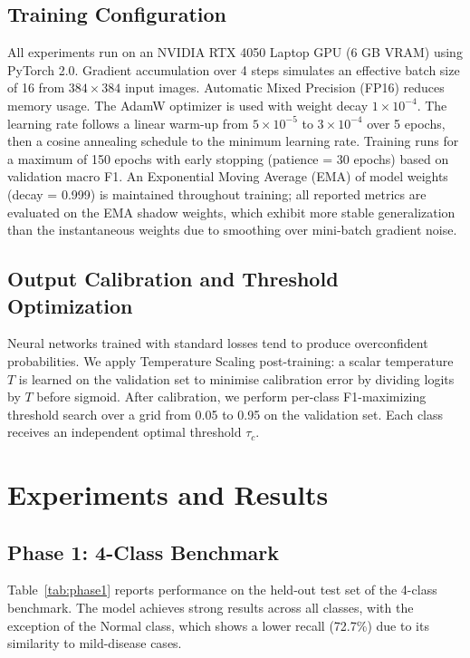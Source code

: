 \documentclass[conference]{IEEEtran}
\begin{document}
\subsection{Training Configuration}
All experiments run on an NVIDIA RTX 4050 Laptop GPU (6 GB VRAM) using PyTorch 2.0. Gradient accumulation over 4 steps simulates an effective batch size of 16 from $384{\times}384$ input images. Automatic Mixed Precision (FP16) reduces memory usage. The AdamW optimizer is used with weight decay $1{\times}10^{-4}$. The learning rate follows a linear warm-up from $5{\times}10^{-5}$ to $3{\times}10^{-4}$ over 5 epochs, then a cosine annealing schedule to the minimum learning rate. Training runs for a maximum of 150 epochs with early stopping (patience = 30 epochs) based on validation macro F1. An Exponential Moving Average (EMA) of model weights (decay = 0.999) is maintained throughout training; all reported metrics are evaluated on the EMA shadow weights, which exhibit more stable generalization than the instantaneous weights due to smoothing over mini-batch gradient noise.

\subsection{Output Calibration and Threshold Optimization}
\label{sec:calibration}
Neural networks trained with standard losses tend to produce overconfident probabilities. We apply Temperature Scaling post-training: a scalar temperature $T$ is learned on the validation set to minimise calibration error by dividing logits by $T$ before sigmoid. After calibration, we perform per-class F1-maximizing threshold search over a grid from 0.05 to 0.95 on the validation set. Each class receives an independent optimal threshold $\tau_c$.


\section{Experiments and Results}

\subsection{Phase 1: 4-Class Benchmark}
Table~\ref{tab:phase1} reports performance on the held-out test set of the 4-class benchmark. The model achieves strong results across all classes, with the exception of the Normal class, which shows a lower recall (72.7\%) due to its similarity to mild-disease cases.
\end{document}
